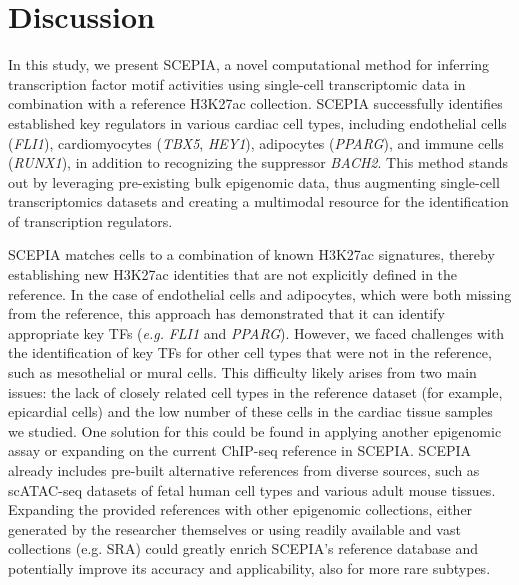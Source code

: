 \section{Discussion}

In this study, we present SCEPIA, a novel computational method for inferring transcription factor motif activities using single-cell transcriptomic data in combination with a reference H3K27ac collection. SCEPIA successfully identifies established key regulators in various cardiac cell types, including endothelial cells (\textit{FLI1}), cardiomyocytes (\textit{TBX5}, \textit{HEY1}), adipocytes (\textit{PPARG}), and immune cells (\textit{RUNX1}), in addition to recognizing the suppressor \textit{BACH2}. This method stands out by leveraging pre-existing bulk epigenomic data, thus augmenting single-cell transcriptomics datasets and creating a multimodal resource for the identification of transcription regulators.

SCEPIA matches cells to a combination of known H3K27ac signatures, thereby establishing new H3K27ac identities that are not explicitly defined in the reference. In the case of endothelial cells and adipocytes, which were both missing from the reference, this approach has demonstrated that it can identify appropriate key TFs (\textit{e.g.} \textit{FLI1} and \textit{PPARG}). However, we faced challenges with the identification of key TFs for other cell types that were not in the reference, such as mesothelial or mural cells. This difficulty likely arises from two main issues: the lack of closely related cell types in the reference dataset (for example, epicardial cells) and the low number of these cells in the cardiac tissue samples we studied. One solution for this could be found in applying another epigenomic assay or expanding on the current ChIP-seq reference in SCEPIA. SCEPIA already includes pre-built alternative references from diverse sources, such as scATAC-seq datasets of fetal human cell types\cite{Domcke2020} and various adult mouse tissues\cite{Cusanovich2018}. Expanding the provided references with other epigenomic collections, either generated by the researcher themselves or using readily available and vast collections (e.g. SRA) could greatly enrich SCEPIA's reference database and potentially improve its accuracy and applicability, also for more rare subtypes. 


